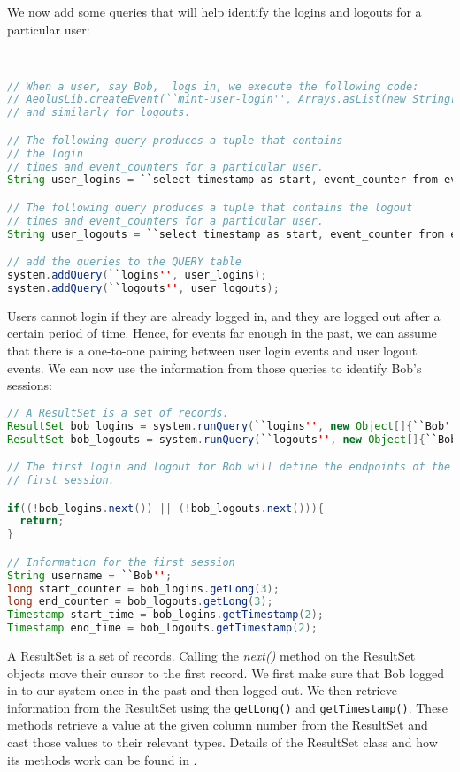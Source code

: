 We now add some queries that will help identify the logins and logouts for a particular user:

\begin{lstlisting}[language=Java]


// When a user, say Bob,  logs in, we execute the following code:
// AeolusLib.createEvent(``mint-user-login'', Arrays.asList(new String[]{``Bob''}));
// and similarly for logouts.

// The following query produces a tuple that contains 
// the login
// times and event_counters for a particular user.
String user_logins = ``select timestamp as start, event_counter from events where app_op='mint-user-login' and app_arg[0]=?'';

// The following query produces a tuple that contains the logout
// times and event_counters for a particular user.
String user_logouts = ``select timestamp as start, event_counter from events where app_op='mint-user-logout' and to_array(app_args)[0]=?'';

// add the queries to the QUERY table
system.addQuery(``logins'', user_logins);
system.addQuery(``logouts'', user_logouts);
\end{lstlisting}

\noindent
Users cannot login if they are already logged in, and they are logged out after a certain period of time. Hence, for events far enough in the past, we can assume that there is a one-to-one pairing between user login events and user logout events. We can now use the information from those queries to identify Bob's sessions:

\begin{lstlisting}[language=Java]
// A ResultSet is a set of records.
ResultSet bob_logins = system.runQuery(``logins'', new Object[]{``Bob''});
ResultSet bob_logouts = system.runQuery(``logouts'', new Object[]{``Bob''});

// The first login and logout for Bob will define the endpoints of the
// first session.

if((!bob_logins.next()) || (!bob_logouts.next())){
  return;
}

// Information for the first session
String username = ``Bob'';
long start_counter = bob_logins.getLong(3);
long end_counter = bob_logouts.getLong(3);
Timestamp start_time = bob_logins.getTimestamp(2);
Timestamp end_time = bob_logouts.getTimestamp(2);
\end{lstlisting}

\noindent
A ResultSet is a set of records. Calling the \emph{next()} method on the ResultSet objects move their cursor to the first record. We first make sure that Bob logged in to our system once in the past and then logged out. We then retrieve information from the ResultSet using the \lstinline$getLong()$ and \lstinline$getTimestamp()$. These methods retrieve a value at the given column number from the ResultSet and cast those values to their relevant types. Details of the ResultSet class and how its methods work can be found in \cite{jdoc}.

